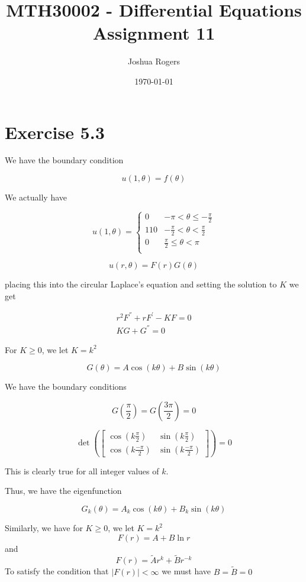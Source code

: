 \documentclass{article}
\title{\vspace{-4cm}MTH30002 - Differential Equations Assignment 11}
\author{Joshua Rogers}
\date\today
\begin{document}
\maketitle

\section*{Exercise 5.3}

We have the boundary condition

$$u(1,\theta) = f(\theta)$$

We actually have

$$
u(1,\theta) = \begin{cases}
0 & -\pi < \theta \leq -\frac{\pi}{2} \\
110 & -\frac{\pi}{2} < \theta < \frac{\pi}{2} \\
0 & \frac{\pi}{2} \leq \theta < \pi \\
   \end{cases}
$$

$$u(r,\theta) = F(r)G(\theta)$$

placing this into the circular Laplace's equation and setting the solution to $K$ we get

\begin{align*}
r^2 F^{''} + rF^{'}-KF=0 \\
KG+G^{''}=0
\end{align*}


For $K \geq 0$, we let $K=k^2$

$$G(\theta) = A\cos(k\theta) + B\sin(k\theta)$$

We have the boundary conditions

$$G\left(\frac{\pi}{2}\right) = G\left(\frac{3\pi}{2}\right) = 0$$

$$\det \left( \begin{bmatrix} \cos\left(k\frac{\pi}{2}\right) & \sin\left(k\frac{\pi}{2}\right) \\ \cos\left(k\frac{-\pi}{2}\right) & \sin\left(k\frac{-\pi}{2}\right) \end{bmatrix} \right) = 0 $$

This is clearly true for all integer values of $k$.

Thus, we have the eigenfunction

$$G_k(\theta) = A_k \cos(k\theta) + B_k \sin(k\theta)$$



Similarly, we have for $K \geq 0$, we let $K=k^2$
$$F(r) = A + B \ln r$$
and
$$F(r) = \tilde{A} r^k + \tilde{B} r^{-k}$$
To satisfy the condition that $|F(r)| < \infty$ we must have $B = \tilde{B} = 0$
\end{document}
